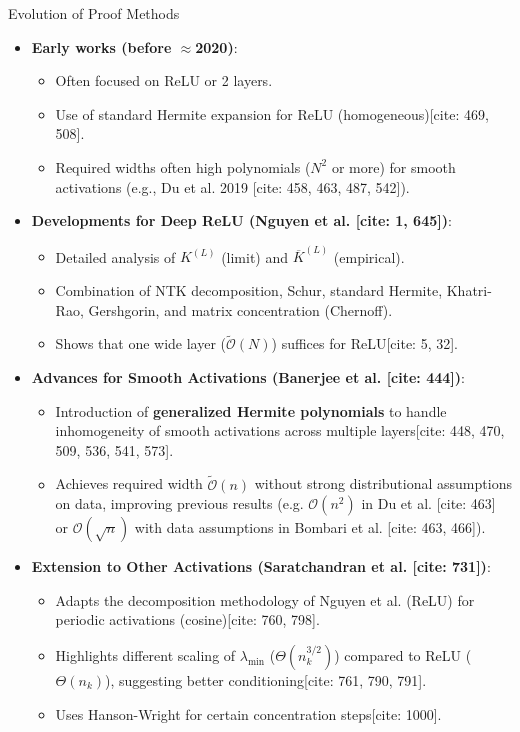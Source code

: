 \documentclass{beamer}
\theoremstyle{definition}
\theoremstyle{remark}
\newcommand{\lambdaMin}{\lambda_{\min}}
\newcommand{\Order}{\mathcal{O}}
\newcommand{\TildeOrder}{\tilde{\mathcal{O}}}
\begin{document}
\begin{frame}{Evolution of Proof Methods}
  \justify
  \begin{itemize}
    \item \textbf{Early works (before $\approx$2020)}:
    \begin{itemize}
        \item Often focused on ReLU or 2 layers.
        \item Use of standard Hermite expansion for ReLU (homogeneous)[cite: 469, 508].
        \item Required widths often high polynomials ($N^2$ or more) for smooth activations (e.g., Du et al. 2019 [cite: 458, 463, 487, 542]).
    \end{itemize}
    \pause
    \item \textbf{Developments for Deep ReLU (Nguyen et al. [cite: 1, 645])}:
    \begin{itemize}
        \item Detailed analysis of $K^{(L)}$ (limit) and $\overline{K}^{(L)}$ (empirical).
        \item Combination of NTK decomposition, Schur, standard Hermite, Khatri-Rao, Gershgorin, and matrix concentration (Chernoff).
        \item Shows that one wide layer ($\TildeOrder(N)$) suffices for ReLU[cite: 5, 32].
    \end{itemize}
    \pause
    \item \textbf{Advances for Smooth Activations (Banerjee et al. [cite: 444])}:
    \begin{itemize}
        \item Introduction of \textbf{generalized Hermite polynomials} to handle inhomogeneity of smooth activations across multiple layers[cite: 448, 470, 509, 536, 541, 573].
        \item Achieves required width $\TildeOrder(n)$ without strong distributional assumptions on data, improving previous results (e.g. $\Order(n^2)$ in Du et al. [cite: 463] or $\Order(\sqrt{n})$ with data assumptions in Bombari et al. [cite: 463, 466]).
    \end{itemize}
    \pause
    \item \textbf{Extension to Other Activations (Saratchandran et al. [cite: 731])}:
    \begin{itemize}
        \item Adapts the decomposition methodology of Nguyen et al. (ReLU) for periodic activations (cosine)[cite: 760, 798].
        \item Highlights different scaling of $\lambdaMin$ ($\Theta(n_k^{3/2})$) compared to ReLU ($\Theta(n_k)$), suggesting better conditioning[cite: 761, 790, 791].
        \item Uses Hanson-Wright for certain concentration steps[cite: 1000].
    \end{itemize}
  \end{itemize}
\end{frame}
\end{document}
